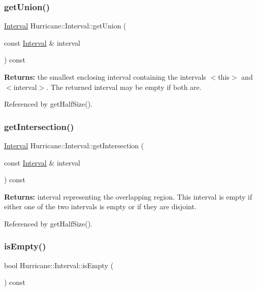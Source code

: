 \subsubsection{\texorpdfstring{get\+Union()}{getUnion()}}
{\footnotesize\ttfamily \hyperlink{classHurricane_1_1Interval}{Interval} Hurricane\+::\+Interval\+::get\+Union (\begin{DoxyParamCaption}\item[{const \hyperlink{classHurricane_1_1Interval}{Interval} \&}]{interval }\end{DoxyParamCaption}) const}

{\bfseries Returns\+:} the smallest enclosing interval containing the intervals {\ttfamily $<$this$>$} and {\ttfamily $<$interval$>$}. The returned interval may be empty if both are. 

Referenced by get\+Half\+Size().

\mbox{\label{classHurricane_1_1Interval_ad9baf434d669fddf9cd30aa74e0c4486}} 
\subsubsection{\texorpdfstring{get\+Intersection()}{getIntersection()}}
{\footnotesize\ttfamily \hyperlink{classHurricane_1_1Interval}{Interval} Hurricane\+::\+Interval\+::get\+Intersection (\begin{DoxyParamCaption}\item[{const \hyperlink{classHurricane_1_1Interval}{Interval} \&}]{interval }\end{DoxyParamCaption}) const}

{\bfseries Returns\+:} interval representing the overlapping region. This interval is empty if either one of the two intervals is empty or if they are disjoint. 

Referenced by get\+Half\+Size().

\mbox{\label{classHurricane_1_1Interval_a5bf0292743d02f861a194c48c823c7ce}} 
\subsubsection{\texorpdfstring{is\+Empty()}{isEmpty()}}
{\footnotesize\ttfamily bool Hurricane\+::\+Interval\+::is\+Empty (\begin{DoxyParamCaption}{ }\end{DoxyParamCaption}) const\hspace{0.3cm}{\ttfamily [inline]}}

